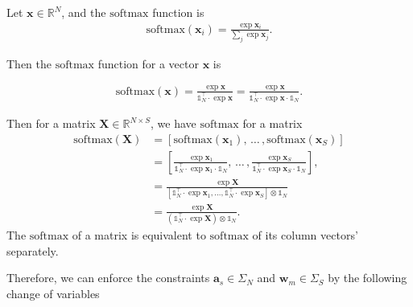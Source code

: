 \begin{definition}
  Let $\mathbf{x} \in \mathbb{R}^N$, and the $\text{softmax}$ function is
  \begin{equation*}
    \begin{aligned}
      \text{softmax}\left(\mathbf{x}_i\right) = \frac{\exp\mathbf{x}_i}{\sum_j \exp \mathbf{x}_j}.
    \end{aligned}
  \end{equation*}

  Then the $\text{softmax}$ function for a vector $\mathbf{x}$ is

  \begin{equation*}
    \begin{aligned}
      \text{softmax}\left(\mathbf{x}\right)
      = \frac{\exp \mathbf{x}}{\mathbb{1}_N^\top \cdot \exp \mathbf{x}}
      = \frac{\exp \mathbf{x}}{\mathbb{1}_N^\top \cdot \exp \mathbf{x} \cdot \mathbb{1}_N}.
    \end{aligned}
  \end{equation*}

  Then for a matrix $\mathbf{X} \in \mathbb{R}^{N \times S}$, we have $\text{softmax}$ for a matrix
  \begin{equation*}
    \begin{aligned}
      \text{softmax} \left(\mathbf{X}\right)
       & =
      \left[
        \text{softmax}\left(\mathbf{x}_1\right), \,\ldots\,, \text{softmax}\left(\mathbf{x}_S\right)
      \right]     \\
       & = \left[
        \frac{\exp \mathbf{x}_1}{\mathbb{1}_N^\top \cdot \exp \mathbf{x}_1 \cdot \mathbb{1}_N},
        \,\ldots\,,
        \frac{\exp \mathbf{x}_S}{\mathbb{1}_N^\top \cdot \exp \mathbf{x}_S \cdot \mathbb{1}_N}
      \right],    \\
       & = \frac{
        \exp \mathbf{X}
      }{
        \left[
          \mathbb{1}_N^\top\cdot \exp \mathbf{x}_1, \ldots, \mathbb{1}_N^\top\cdot \exp \mathbf{x}_S
          \right] \otimes \mathbb{1}_N
      }           \\
       & =
      \frac{
        \exp \mathbf{X}
      }{
        \left(\mathbb{1}_N^\top \cdot \exp \mathbf{X}\right)\otimes \mathbb{1}_N
      }.
    \end{aligned}
  \end{equation*}
  The $\text{softmax}$ of a matrix is equivalent to $\text{softmax}$ of its column vectors' separately.
\end{definition}

Therefore, we can enforce the constraints $\mathbf{a}_s \in \Sigma_N$ and $\mathbf{w}_m \in \Sigma_S$
by the following change of variables

